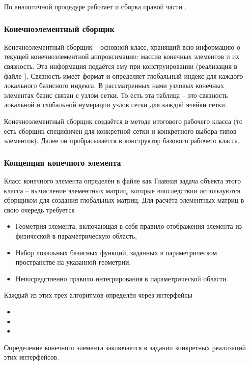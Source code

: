По аналогичной процедуре работает и сборка правой части .

\subsubsection{Конечноэлементный сборщик}
Конечноэлементный сборщик  -- основной класс, хранящий
всю информацию о текущей конечноэлементной аппроксимации: 
массив конечных элементов и их связность.
Эта информация подаётся ему при конструировании (реализация в файле ).
Связность  имеет формат  и
определяет глобальный индекс для каждого локального базисного индекса.
В рассматренных нами узловых конечных элементах базис связан с узлом сетки.
То есть эта таблица -- это связность локальной и глобальной нумерации узлов сетки для каждой ячейки сетки.

Конечноэлементный сборщик создаётся в методе
 итогового
рабочего класса (то есть сборщик специфичен для конкретной сетки
и конкретного выбора типов элементов). Далее он пробрасывается в конструктор базового рабочего класса.

\subsubsection{Концепция конечного элемента}
Класс конечного элемента  определён в файле
 как
Главная задача объекта этого класса -- вычисление элементных матриц,
которые впоследствии используются сборщиком
для создания глобальных матриц.
Для расчёта элементных матриц в свою очередь требуется
\begin{itemize}
\item Геометрия элемента, включающая в себя правило отображения элемента из физической в параметрическую область,
\item Набор локальных базисных функций, заданных в параметрическом пространстве на указанной геометрии,
\item Непосредственно правило интегрирования в параметрической области.
\end{itemize}
Каждый из этих трёх алгоритмов определён через интерфейсы
\begin{itemize}
\item {}
\item {}
\item {}
\end{itemize}
Определение конечного элемента заключается в задании конкретных реализаций этих интерфейсов.

